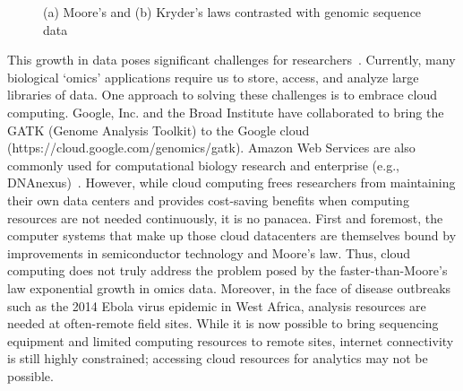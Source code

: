 \documentclass{acm_proc_article-sp}
\begin{document}
\begin{figure}[htb!]
\centering
{}
\caption[Sequencing vs. Storage]{(a) Moore's and (b) Kryder's laws contrasted with genomic sequence data}
\label{fig:growth}
\end{figure}

This growth in data poses significant challenges for 
researchers~\cite{marx2013biology}.
Currently, many biological `omics' applications require us to store, access, 
and analyze large libraries of data.
One approach to solving these challenges is to embrace cloud computing.
Google, Inc. and the Broad Institute have collaborated to bring the GATK 
(Genome 
Analysis Toolkit) to the Google cloud (https://cloud.google.com/genomics/gatk).
Amazon Web Services are also commonly used for computational biology 
research and enterprise (e.g., DNAnexus)~\cite{schatz2010cloud}.
However, while cloud computing frees researchers from maintaining their own
data centers and provides cost-saving benefits when computing resources are
not needed continuously, it is no panacea.
First and foremost, the computer systems that make up those cloud datacenters
are themselves bound by improvements in semiconductor technology and Moore's
law. Thus, cloud computing does not truly address the problem posed by the
faster-than-Moore's law exponential growth in omics data.
Moreover, in the face of disease outbreaks such as the 2014 Ebola virus epidemic 
in West Africa, analysis resources are needed at often-remote field sites.
While it is now possible to bring sequencing equipment and limited computing 
resources to remote sites, internet connectivity is still highly constrained;
accessing cloud resources for analytics may not be possible.
\end{document}
